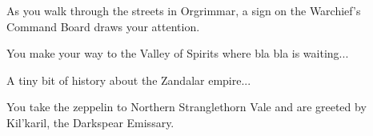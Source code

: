 As you walk through the streets in Orgrimmar, a sign on the Warchief's Command Board draws your attention.


You make your way to the Valley of Spirits where bla bla is waiting...


A tiny bit of history about the Zandalar empire...





You take the zeppelin to Northern Stranglethorn Vale and are greeted by Kil'karil, the Darkspear Emissary.
